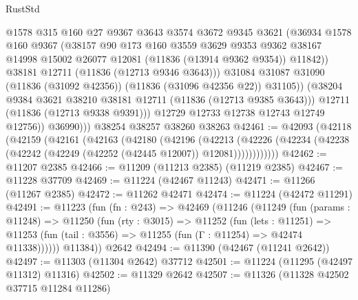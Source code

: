 \begin{lexlean}{RustStd}
\begin{coremodule}
                      @1578
                      @315
                      @160
                      @27
                      @9367
                      @3643
                      @3574
                      @3672
                      @9345
                      @3621
                      (@36934
                        @1578
                        @160
                        @9367
                        (@38157
                          @90
                          @173
                          @160
                          @3559
                          @3629
                          @9353
                          @9362
                          @38167
                          @14998
                          @15002
                          @26077
                          @12081
                          (@11836 (@13914 @9362 @9354))
                          @11842))
                      @38181
                      @12711
                      (@11836 (@12713 @9346 @3643)))
                    @31084
                    @31087
                    @31090
                    (@11836 (@31092 @42356))
                    (@11836 (@31096 @42356 @22))
                    @31105))
                (@38204 @9384 @3621 @38210 @38181 @12711 (@11836 (@12713 @9385 @3643)))
                @12711
                (@11836 (@12713 @9338 @9391)))
              @12729
              @12733
              @12738
              @12743
              @12749
              @12756))
          @36990)))
    @38254
    @38257
    @38260
    @38263
@42461 := @42093
    (@42118
      (@42159
        (@42161
          (@42163
            (@42180
              (@42196
                (@42213
                  (@42226
                    (@42234 (@42238 (@42242 (@42249 (@42252 (@42445 @12007)) @12081))))))))))))
@42462 := @11207 @2385
@42466 := @11209 (@11213 @2385) (@11219 @2385)
@42467 := @11228 @37709
@42469 := @11224 (@42467 @11243)
@42471 := @11266 (@11267 @2385)
@42472 := @11262 @42471
@42474 := @11224 (@42472 @11291)
@42491 := @11223
    (fun (fn : @243) =>
    @42469
      (@11246
        (@11249
          (fun (params : @11248) =>
          @11250
            (fun (rty : @3015) =>
            @11252
              (fun (lets : @11251) =>
              @11253 (fun (tail : @3556) => @11255 (fun (Γ : @11254) => @42474 @11338))))))
        @11384))
    @2642
@42494 := @11390 (@42467 (@11241 @2642))
@42497 := @11303 (@11304 @2642) @37712
@42501 := @11224 (@11295 (@42497 @11312) @11316)
@42502 := @11329 @2642
@42507 := @11326 (@11328 @42502 @37715 @11284 @11286)

\end{coremodule}
\end{lexlean}

